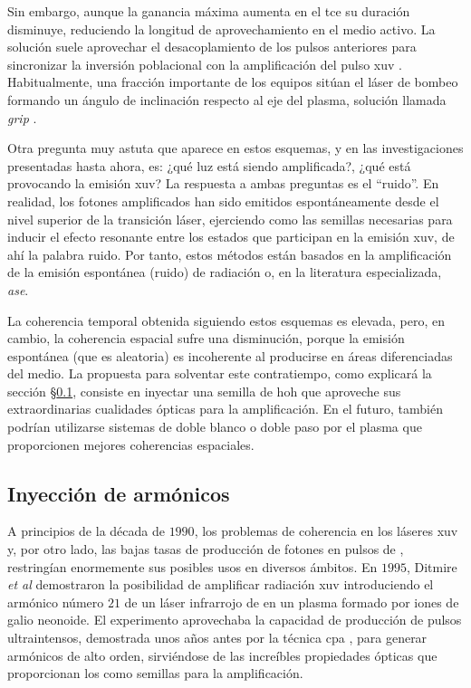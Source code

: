 Sin embargo, aunque la ganancia máxima aumenta en el \acrshort{tce} su duración disminuye, reduciendo la longitud de aprovechamiento en el medio activo. La solución suele aprovechar el desacoplamiento de los pulsos anteriores para sincronizar la inversión poblacional con la amplificación del pulso \acrshort{xuv} \autocite{Kozlova2020a}. Habitualmente, una fracción importante de los equipos sitúan el láser de bombeo formando un ángulo de inclinación respecto al eje del plasma, solución llamada \emph{\acrfull{grip}} \autocite{Keenan2005}.  

Otra pregunta muy astuta que aparece en estos esquemas, y en las investigaciones presentadas hasta ahora, es: ¿qué luz está siendo amplificada?, ¿qué está provocando la emisión \acrshort{xuv}? La respuesta a ambas preguntas es el \enquote{ruido}. En realidad, los fotones amplificados han sido emitidos espontáneamente desde el nivel superior de la transición láser, ejerciendo como las semillas necesarias para inducir el efecto resonante entre los estados que participan en la emisión \acrshort{xuv}, de ahí la palabra ruido. Por tanto, estos métodos están basados en la amplificación de la emisión espontánea (ruido) de radiación o, en la literatura especializada, \emph{\acrfull{ase}}.

La coherencia temporal obtenida siguiendo estos esquemas es elevada, pero, en cambio, la coherencia espacial sufre una disminución, porque la emisión espontánea (que es aleatoria) es incoherente al producirse en áreas diferenciadas del medio. La propuesta para solventar este contratiempo, como explicará la sección \S\ref{sec:1.4.1}, consiste en inyectar una semilla de \acrshort{hoh} que aproveche sus extraordinarias cualidades ópticas para la amplificación. En el futuro, también podrían utilizarse sistemas de doble blanco o doble paso por el plasma que proporcionen mejores coherencias espaciales. 

\subsection{Inyección de armónicos}\label{sec:1.4.1}
A principios de la década de $1990$, los problemas de coherencia en los láseres \acrshort{xuv} y, por otro lado, las bajas tasas de producción de fotones en pulsos de , restringían enormemente sus posibles usos en diversos ámbitos. En $1995$, Ditmire \emph{et al} \autocite{Ditmire1995} demostraron la posibilidad de amplificar radiación \acrshort{xuv} introduciendo el armónico número $21$ de un láser infrarrojo de  en un plasma formado por iones de galio neonoide. El experimento aprovechaba la capacidad de producción de pulsos ultraintensos, demostrada unos años antes por la técnica \acrshort{cpa} \autocite{Maine1988}, para generar armónicos de alto orden, sirviéndose de las increíbles propiedades ópticas que proporcionan los  como semillas para la amplificación.

